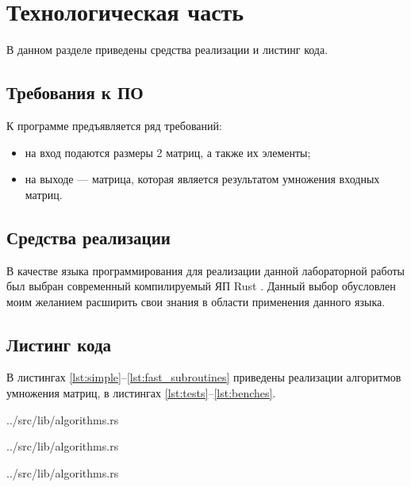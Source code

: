 \chapter{Технологическая часть}

В данном разделе приведены средства реализации и листинг кода.

\section{Требования к ПО}

К программе предъявляется ряд требований:
\begin{itemize}
	\item на вход подаются размеры 2 матриц, а также их элементы;
	\item на выходе — матрица, которая является результатом умножения входных матриц.
\end{itemize}

\section{Средства реализации}

В качестве языка программирования для реализации данной лабораторной работы был выбран современный компилируемый ЯП Rust \cite{rustlang}. Данный выбор обусловлен моим желанием расширить свои знания в области применения данного языка.

\section{Листинг кода}

В листингах \ref{lst:simple}--\ref{lst:fast_subroutines} приведены реализации алгоритмов умножения матриц, в листингах \ref{lst:tests}--\ref{lst:benches}.

\begin{lstinputlisting}[
	caption={Стандартный алгоритм умножения матриц},
	label={lst:simple},
	style={rustlang},
	linerange={19-31}
]{../src/lib/algorithms.rs}
\end{lstinputlisting}

\begin{lstinputlisting}[
	caption={Алгоритм Копперсмита — Винограда},
	label={lst:vino},
	style={rustlang},
	linerange={89-113}
]{../src/lib/algorithms.rs}
\end{lstinputlisting}

\begin{lstinputlisting}[
	caption={Функции алгоритма Копперсмита — Винограда},
	label={lst:subroutines},
	style={rustlang},
	linerange={33-55}
]{../src/lib/algorithms.rs}
\end{lstinputlisting}

